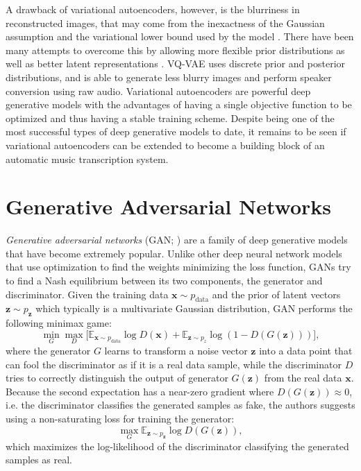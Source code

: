 A drawback of variational autoencoders, however, is the blurriness in reconstructed images, that may come from the inexactness of the Gaussian assumption and the variational lower bound used by the model \cite{doersch2016tutorial}.
There have been many attempts to overcome this by allowing more flexible prior distributions \cite{rezende2015flow} as well as better latent representations \cite{kingma2016iaf}.
VQ-VAE \cite{oord2017vqvae} uses discrete prior and posterior distributions, and is able to generate less blurry images and perform speaker conversion using raw audio.
Variational autoencoders are powerful deep generative models with the advantages of having a single objective function to be optimized and thus having a stable training scheme.
Despite being one of the most successful types of deep generative models to date, it remains to be seen if variational autoencoders can be extended to become a building block of an automatic music transcription system.


\section{Generative Adversarial Networks}\label{sec:gan}

\emph{Generative adversarial networks} (GAN; ) are a family of deep generative models that have become extremely popular.
Unlike other deep neural network models that use optimization to find the weights minimizing the loss function, GANs try to find a Nash equilibrium between its two components, the generator and discriminator.
Given the training data $\bm{x}\sim p_{\mathrm{data}}$ and the prior of latent vectors $\bm{z} \sim p_{\bm{z}}$ which typically is a multivariate Gaussian distribution, GAN performs the following minimax game:
\begin{equation}\label{eqn:gan}
	\min_{G} \max_{D} \Big[ \mathbb{E}_{\bm{x} \sim p_{\mathrm{data}}} {\log D(\bm{x})} + \mathbb{E}_{\bm{z} \sim p_z} \log \left ( 1 - D(G(\bm{z})) \right ) \Big],
\end{equation}
where the generator $G$ learns to transform a noise vector $\bm{z}$ into a data point that can fool the discriminator as if it is a real data sample, while the discriminator $D$ tries to correctly distinguish the output of generator $G(\bm{z})$ from the real data $\bm{x}$.
Because the second expectation has a near-zero gradient where $D(G(\bm{z})) \approx 0$, i.e. the discriminator classifies the generated samples as fake, the authors suggests using a non-saturating loss for training the generator:
\begin{equation}\label{eqn:nsgan}
\max_{G} \mathbb{E}_{\bm{z} \sim p_{\bm{z}}} \log D(G(\bm{z})),
\end{equation}
which maximizes the log-likelihood of the discriminator classifying the generated samples as real.


